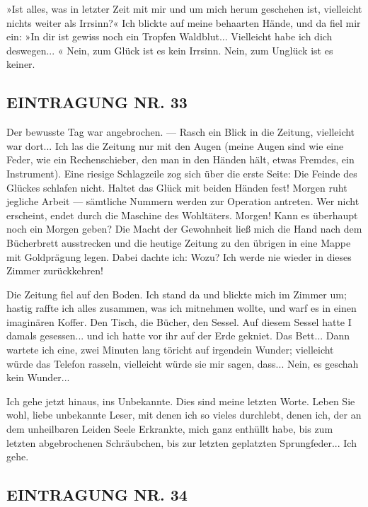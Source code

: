 »Ist alles, was in letzter Zeit mit mir und um mich herum geschehen
ist, vielleicht nichts weiter als Irrsinn?« Ich blickte auf meine
behaarten Hände, und da fiel mir ein: »In dir ist gewiss noch ein
Tropfen Waldblut... Vielleicht habe ich dich deswegen... « Nein,
zum Glück ist es kein Irrsinn. Nein, zum Unglück ist es keiner.

\subsection{EINTRAGUNG NR. 33}

Der bewusste Tag war angebrochen. — Rasch ein Blick in die Zeitung,
vielleicht war dort... Ich las die Zeitung nur mit den Augen (meine
Augen sind wie eine Feder, wie ein Rechenschieber, den man in den
Händen hält, etwas Fremdes, ein Instrument). Eine riesige
Schlagzeile zog sich über die erste Seite: Die Feinde des Glückes
schlafen nicht. Haltet das Glück mit beiden Händen fest! Morgen
ruht jegliche Arbeit — sämtliche Nummern werden zur Operation
antreten. Wer nicht erscheint, endet durch die Maschine des
Wohltäters. Morgen! Kann es überhaupt noch ein Morgen geben? Die
Macht der Gewohnheit ließ mich die Hand nach dem Bücherbrett
ausstrecken und die heutige Zeitung zu den übrigen in eine Mappe
mit Goldprägung legen. Dabei dachte ich: Wozu? Ich werde nie wieder
in dieses Zimmer zurückkehren!

Die Zeitung fiel auf den Boden. Ich stand da und blickte mich im
Zimmer um; hastig raffte ich alles zusammen, was ich mitnehmen
wollte, und warf es in einen imaginären Koffer. Den Tisch, die
Bücher, den Sessel. Auf diesem Sessel hatte I damals gesessen...
und ich hatte vor ihr auf der Erde gekniet. Das Bett... Dann
wartete ich eine, zwei Minuten lang töricht auf irgendein Wunder;
vielleicht würde das Telefon rasseln, vielleicht würde sie mir
sagen, dass... Nein, es geschah kein Wunder...

Ich gehe jetzt hinaus, ins Unbekannte. Dies sind meine letzten
Worte. Leben Sie wohl, liebe unbekannte Leser, mit denen ich so
vieles durchlebt, denen ich, der an dem unheilbaren Leiden Seele
Erkrankte, mich ganz enthüllt habe, bis zum letzten abgebrochenen
Schräubchen, bis zur letzten geplatzten Sprungfeder... Ich gehe.

\subsection{EINTRAGUNG NR. 34}

